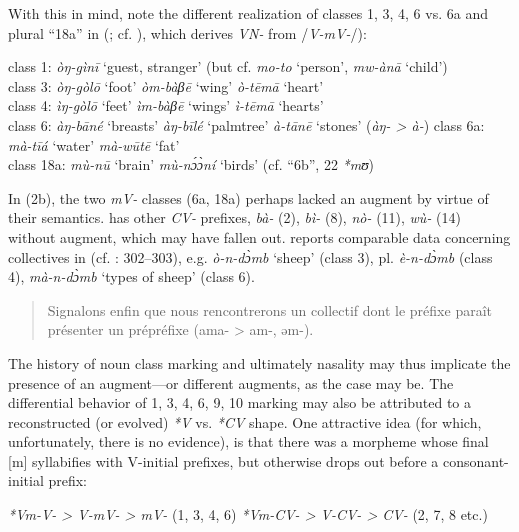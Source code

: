 \documentclass[output=paper]{langsci/langscibook}
\begin{document}
With this in mind, note the different realization of classes 1, 3, 4, 6 vs. 6a and plural “18a” in  (\citealt{Hyman1980tuki}; cf. \citet{Musada1995}), which derives \textit{VN-} from /\textit{V-mV-}/):

\ea%
    \label{ex:nasal:2} 
\ea  class 1:  \textit{òŋ-gìnī}  ‘guest, stranger’  (but cf. \textit{mo-to} ‘person’, \textit{mw-ànā} ‘child’)\\
    class 3:  \textit{òŋ-gòl\={o}}  ‘foot’  \textit{òm-bàβē}  ‘wing’  \textit{ò-tēmā}  ‘heart’\\
    class 4:  \textit{ìŋ-gòl\={o}}  ‘feet’  \textit{ìm-bàβē}  ‘wings’  \textit{ì-tēmā}  ‘hearts’\\
    class 6:  \textit{àŋ-bāné}  ‘breasts’  \textit{àŋ-bīlé}  ‘palmtree’  \textit{à-tānē}  ‘stones’ (\textit{àŋ- > à-})
\ex  class 6a:  \textit{mà-tīá}  ‘water’  \textit{mà-wūtē}  ‘fat’\\
    class 18a:  \textit{mù-nū}  ‘brain’  \textit{mù-nɔ́ɔ̀ní}  ‘birds’  (cf.  “6b”,  22 \textit{*mʊ})
\z
\z

In (2b), the two \textit{mV-} classes (6a, 18a) perhaps lacked an augment by virtue of their semantics.  has other \textit{CV-} prefixes, \textit{bà-} (2), \textit{bì-} (8), \textit{nò-} (11), \textit{wù-} (14) without augment, which may have fallen out. \citet[65]{Dugast1971} reports comparable data concerning collectives in  (cf. \citealt{Mous2003}: 302--303), e.g. \textit{ò-n-dɔ̀mb} ‘sheep’ (class 3), pl. \textit{è-n-dɔ̀mb} (class 4), \textit{mà-n-dɔ̀mb} ‘types of sheep’ (class 6).

\begin{quote}
  Signalons enfin que nous rencontrerons un collectif dont le préfixe paraît présenter un prépréfixe (ama- > am-, əm-). \citep[65]{Dugast1971}
\end{quote}


The history of noun class marking and ultimately nasality may thus implicate the presence of an augment—or different augments, as the case may be. The differential behavior of 1, 3, 4, 6, 9, 10 marking may also be attributed to a reconstructed (or evolved) \textit{*V} vs. \textit{*CV} shape. One attractive idea (for which, unfortunately, there is no evidence), is that there was a morpheme whose final [m] syllabifies with V-initial prefixes, but otherwise drops out before a consonant-initial prefix:

\ea%
    \label{ex:nasal:3}
    \ea  \textit{*Vm-V-  >  V-mV-  >  mV- } (1, 3, 4, 6)
\ex      \textit{*Vm-CV-  >  V-CV-  >  CV-}  (2, 7, 8 etc.)
\z
\z
\end{document}
